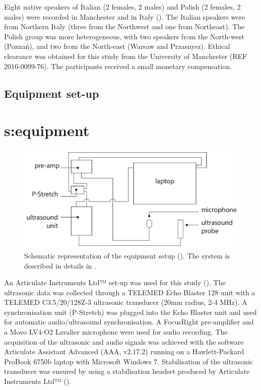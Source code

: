 \documentclass[authoryear, twocolumn]{elsarticle}
\begin{document}
Eight native speakers of Italian (2 females, 2 males) and Polish (2
females, 2 males) were recorded in Manchester and in Italy
(). The Italian speakers were from Northern Italy
(three from the Northwest and one from Northeast). The Polish group was
more heterogeneous, with two speakers from the North-west (Poznań), and
two from the North-east (Warsaw and Przasnysz). Ethical clearance was
obtained for this study from the University of Manchester (REF
2016-0099-76). The participants received a small monetary compensation.

\subsection{Equipment set-up}\label{equipment-set-up}

\section{s:equipment}

\begin{figure}
    \centering
    \includegraphics[width=.7\textwidth]{../../graphics/uti-setup.pdf}
    \caption{Schematic representation of the equipment setup (\citealt{articulate2011}). The system is described in details in .}
    \label{f:uti-setup}
\end{figure}

An Articulate Instruments Ltd™ set-up was used for this study
(). The ultrasonic data was collected through a
TELEMED Echo Blaster 128 unit with a TELEMED C3.5/20/128Z-3 ultrasonic
transducer (20mm radius, 2-4 MHz). A synchronisation unit (P-Stretch)
was plugged into the Echo Blaster unit and used for automatic
audio/ultrasound synchronisation. A FocusRight pre-amplifier and a Movo
LV4-O2 Lavalier microphone were used for audio recording. The
acquisition of the ultrasonic and audio signals was achieved with the
software Articulate Assistant Advanced (AAA, v2.17.2) running on a
Hawlett-Packard ProBook 6750b laptop with Microsoft Windows 7.
Stabilisation of the ultrasonic transducer was ensured by using a
stabilisation headset produced by Articulate Instruments Ltd™
(\citealt{articulate2008}).
\end{document}
